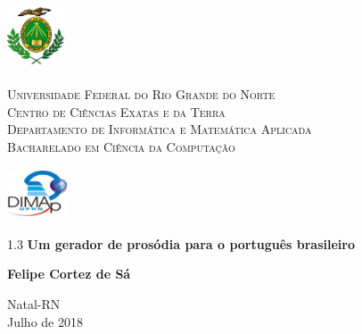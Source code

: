 \begin{titlepage}
	\begin{center}
		
		\begin{minipage}{2cm}
			\begin{center}
				\includegraphics[width=1.7cm, height=2.0cm]{Imagens/Brasao-UFRN.jpg}
			\end{center}
		\end{minipage}
		\begin{minipage}{11cm}
			\begin{center}
				\begin{espacosimples}
					{\small \textsc{Universidade Federal do Rio Grande do Norte}			\\
							  \textsc{Centro de Ciências Exatas e da Terra}						\\
							  \textsc{Departamento de Informática e Matemática Aplicada}	\\
							  \textsc{Bacharelado em Ciência da Computação}}
				\end{espacosimples}
			\end{center}
		\end{minipage}
		\begin{minipage}{2cm}
			\begin{center}
				\includegraphics[width=1.8cm, height=1.5cm]{Imagens/Logotipo-DIMAp.jpg}
			\end{center}
		\end{minipage}
			
		\vspace{6cm}
						
		{\setlength{\baselineskip}%
		{1.3\baselineskip}
		{\LARGE \textbf{Um gerador de prosódia para o português brasileiro}}\par}
			
		\vspace{4cm}
			
		{\large \textbf{Felipe Cortez de Sá}}
						
		\vspace{7cm}
		
		Natal-RN\\Julho de 2018
	\end{center}
\end{titlepage}
